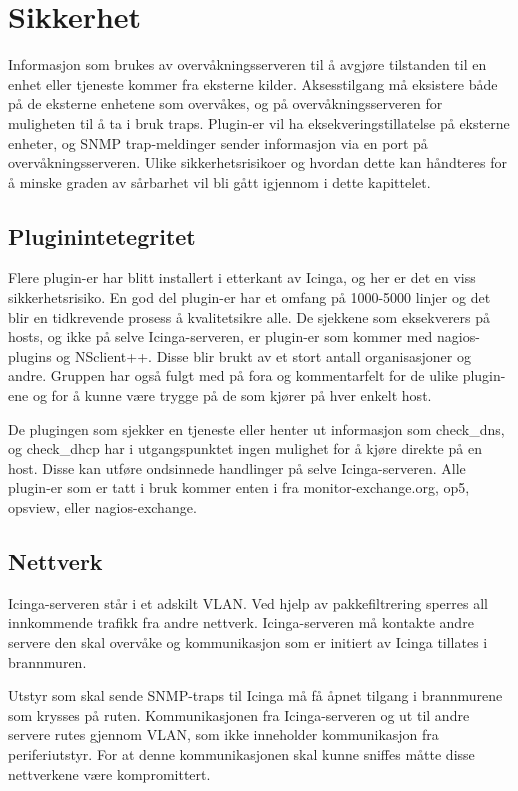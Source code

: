 \chapter{Sikkerhet}\label{chap:sikkerhet}
Informasjon som brukes av overvåkningsserveren til å avgjøre tilstanden til en enhet eller tjeneste kommer fra eksterne kilder. Aksesstilgang må eksistere både på de eksterne enhetene som overvåkes, og på overvåkningsserveren for muligheten til å ta i bruk traps. Plugin-er vil ha eksekveringstillatelse på eksterne enheter, og SNMP trap-meldinger sender informasjon via en port på overvåkningsserveren. Ulike sikkerhetsrisikoer og hvordan dette kan håndteres for å minske graden av sårbarhet vil bli gått igjennom i dette kapittelet.

\section{Pluginintetegritet}
Flere plugin-er har blitt installert i etterkant av Icinga, og her er det en viss sikkerhetsrisiko. En god del plugin-er har et omfang på 1000-5000 linjer og det blir en tidkrevende prosess å kvalitetsikre alle. De sjekkene som eksekverers på hosts, og ikke på selve Icinga-serveren, er plugin-er som kommer med nagios-plugins og NSclient++. Disse blir brukt av et stort antall organisasjoner og andre. Gruppen har også fulgt med på fora og kommentarfelt for de ulike plugin-ene og for å kunne være trygge på de som kjører på hver enkelt host. 

De plugingen som sjekker en tjeneste eller henter ut informasjon som check\_dns, og check\_dhcp har i utgangspunktet ingen mulighet for å kjøre direkte på en host. Disse kan utføre ondsinnede handlinger på selve Icinga-serveren. Alle plugin-er som er tatt i bruk kommer enten i fra monitor-exchange.org, op5, opsview, eller nagios-exchange.
\section{Nettverk}
Icinga-serveren står i et adskilt VLAN. Ved hjelp av pakkefiltrering sperres all innkommende trafikk fra andre nettverk. Icinga-serveren må kontakte andre servere den skal overvåke og kommunikasjon som er initiert av Icinga tillates i brannmuren. 

Utstyr som skal sende SNMP-traps til Icinga må få åpnet tilgang i brannmurene som krysses på ruten. Kommunikasjonen fra Icinga-serveren og ut til andre servere rutes gjennom VLAN, som ikke inneholder kommunikasjon fra periferiutstyr. For at denne kommunikasjonen skal kunne sniffes måtte disse nettverkene være kompromittert.

